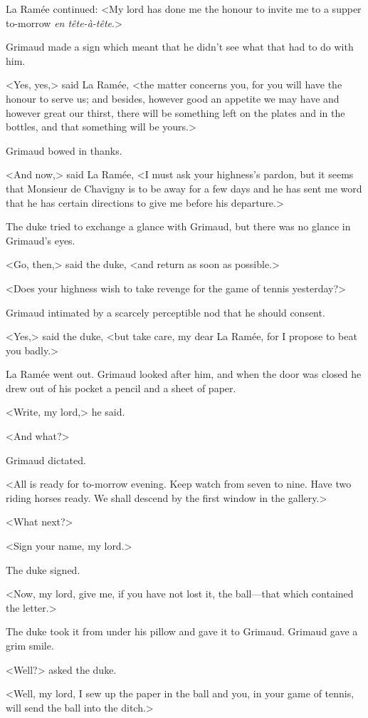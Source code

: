 La Ramée continued: <My lord has done me the honour to invite me to a supper to-morrow \textit{en tête-à-tête}.>

Grimaud made a sign which meant that he didn't see what that had to do with him.

<Yes, yes,> said La Ramée, <the matter concerns you, for you will have the honour to serve us; and besides, however good an appetite we may have and however great our thirst, there will be something left on the plates and in the bottles, and that something will be yours.>

Grimaud bowed in thanks.

<And now,> said La Ramée, <I must ask your highness's pardon, but it seems that Monsieur de Chavigny is to be away for a few days and he has sent me word that he has certain directions to give me before his departure.>

The duke tried to exchange a glance with Grimaud, but there was no glance in Grimaud's eyes.

<Go, then,> said the duke, <and return as soon as possible.>

<Does your highness wish to take revenge for the game of tennis yesterday?>

Grimaud intimated by a scarcely perceptible nod that he should consent.

<Yes,> said the duke, <but take care, my dear La Ramée, for I propose to beat you badly.>

La Ramée went out. Grimaud looked after him, and when the door was closed he drew out of his pocket a pencil and a sheet of paper.

<Write, my lord,> he said.

<And what?>

Grimaud dictated.

<All is ready for to-morrow evening. Keep watch from seven to nine. Have two riding horses ready. We shall descend by the first window in the gallery.>

<What next?>

<Sign your name, my lord.>

The duke signed.

<Now, my lord, give me, if you have not lost it, the ball—that which contained the letter.>

The duke took it from under his pillow and gave it to Grimaud. Grimaud gave a grim smile.

<Well?> asked the duke.

<Well, my lord, I sew up the paper in the ball and you, in your game of tennis, will send the ball into the ditch.>

